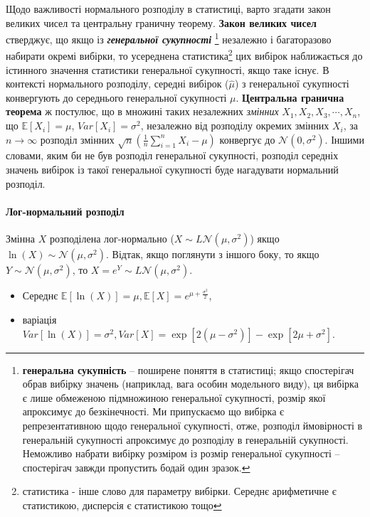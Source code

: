 \documentclass[
  11pt,
]{book}
\begin{document}
Щодо важливості нормального розподілу в статистиці, варто згадати закон великих чисел та центральну граничну теорему. \textbf{Закон великих чисел} стверджує, що якщо із \textbf{\emph{генеральної сукупності}} \footnote{\textbf{генеральна сукупність} -- поширене поняття в статистиці; якщо спостерігач обрав вибірку значень (наприклад, вага особин модельного виду), ця вибірка є лише обмеженою підмножиною генеральної сукупності, розмір якої апроксимує до безкінечності. Ми припускаємо що вибірка є репрезентативною щодо генеральної сукупності, отже, розподіл ймовірності в генеральній сукупності апроксимує до розподілу в генеральній сукупності. Неможливо набрати вибірку розміром із розмір генеральної сукупності -- спостерігач завжди пропустить бодай один зразок.} незалежно і багаторазово набирати окремі вибірки, то усереднена статистика\footnote{статистика - інше слово для параметру вибірки. Середнє арифметичне є статистикою, дисперсія є статистикою тощо} цих вибірок наближається до істинного значення статистики генеральної сукупності, якщо таке існує. В контексті нормального розподілу, середні вибірок (\(\hat{\mu}\)) з генеральної сукупності конвергують до середнього генеральної сукупності \(\mu\). \textbf{Центральна гранична теорема} ж постулює, що в множині таких незалежних \emph{змінних} \(X_1, X_2, X_3, \cdots, X_n\), що \(\mathbb{E} [X_i] = \mu\), \(Var[X_i] = \sigma^2\), незалежно від розподілу окремих змінних \(X_i\), за \(n \rightarrow \infty\) розподіл змінних \(\sqrt{n} (\frac{1}{n}\sum \limits_{i=1}^n X_i - \mu)\) конвергує до \(\mathcal{N}(0,  \sigma^2)\). Іншими словами, яким би не був розподіл генеральної сукупності, розподіл середніх значень вибірок із такої генеральної сукупності буде нагадувати нормальний розподіл.

\paragraph{Лог-нормальний розподіл}\label{ux43bux43eux433-ux43dux43eux440ux43cux430ux43bux44cux43dux438ux439-ux440ux43eux437ux43fux43eux434ux456ux43b}

Змінна \(X\) розподілена лог-нормально (\(X \sim L\mathcal{N}(\mu, \sigma^2)\)) якщо \(\ln(X) \sim \mathcal{N}(\mu, \sigma^2)\). Відтак, якщо поглянути з іншого боку, то якщо \(Y \sim \mathcal{N}(\mu, \sigma^2)\), то \(X = e^Y \sim L\mathcal{N}(\mu, \sigma^2)\).

\begin{itemize}
\item
  Середнє \(\mathbb{E} [\ln (X)] = \mu, \mathbb{E}[X] = e^{\mu + \frac{\sigma^2}{2}}\),
\item
  варіація \(Var[\ln(X)] = \sigma^2, Var[X] = \exp [2(\mu - \sigma^2)] - \exp [2 \mu + \sigma^2]\).
\end{itemize}
\end{document}
